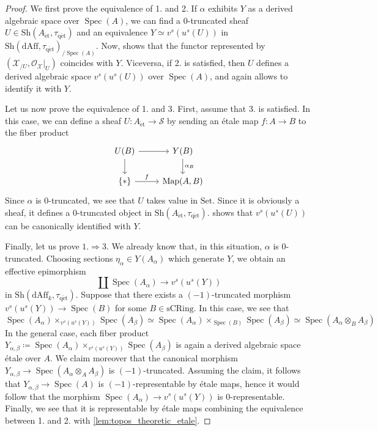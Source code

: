 \documentclass[12pt,a4paper,reqno]{amsart}
\theoremstyle{plain}
\theoremstyle{definition}
\theoremstyle{remark}
\numberwithin{equation}{section}
\begin{document}
\begin{proof}
	We first prove the equivalence of 1. and 2.
	If $\alpha$ exhibits $Y$ as a derived algebraic space over $\operatorname{Spec}(A)$, we can find a $0$-truncated sheaf $U \in {\mathrm{Sh}}(A_{\mathrm{\acute{e}t}}, {\tau_\mathrm{q\acute{e}t}})$ and an equivalence $Y \simeq v^s(u^s(U))$ in ${\mathrm{Sh}}(\mathrm{dAff}, {\tau_\mathrm{q\acute{e}t}})_{/\operatorname{Spec}(A)}$.
	Now, \cite[Remark 2.3.4]{DAG-V} shows that the functor represented by $({\mathcal X}_{/U}, {\mathcal O}_{\mathcal X} |_U)$ coincides with $Y$.
	Viceversa, if 2. is satisfied, then $U$ defines a derived algebraic space $v^s(u^s(U))$ over $\operatorname{Spec}(A)$, and \cite[Remark 2.3.4]{DAG-V} again allows to identify it with $Y$.
	
	Let us now prove the equivalence of 1. and 3. First, assume that 3. is satisfied.
	In this case, we can define a sheaf $U \colon A_{\mathrm{\acute{e}t}} \to {\mathcal S}$ by sending an \'etale map $f \colon A \to B$ to the fiber product
	\[ \begin{tikzcd}
	U(B) \arrow{r} \arrow{d} & Y(B) \arrow{d}{\alpha_B} \\
	\{*\} \arrow{r}{f} & \operatorname{Map}(A,B)
	\end{tikzcd} \]
	Since $\alpha$ is $0$-truncated, we see that $U$ takes value in ${\mathrm{Set}}$.
	Since it is obviously a sheaf, it defines a $0$-truncated object in ${\mathrm{Sh}}(A_{\mathrm{\acute{e}t}}, {\tau_\mathrm{q\acute{e}t}})$.
	\cite[Remark 2.3.4]{DAG-V} shows that $v^s(u^s(U))$ can be canonically identified with $Y$.
	
	Finally, let us prove $1. \Rightarrow 3.$
	We already know that, in this situation, $\alpha$ is $0$-truncated.
	Choosing sections $\eta_\alpha \in Y(A_\alpha)$ which generate $Y$, we obtain an effective epimorphism
	\[ \coprod \operatorname{Spec}(A_\alpha) \to v^s(u^s(Y)) \]
	in ${\mathrm{Sh}}(\mathrm{dAff}_k, {\tau_\mathrm{q\acute{e}t}})$.
	Suppose that there exists a $(-1)$-truncated morphism $v^s(u^s(Y)) \to \operatorname{Spec}(B)$ for some $B \in \mathrm{sCRing}$.
	In this case, we see that
	\[ \operatorname{Spec}(A_\alpha) \times_{v^s(u^s(Y))} \operatorname{Spec}(A_\beta) \simeq \operatorname{Spec}(A_\alpha) \times_{\operatorname{Spec}(B)} \operatorname{Spec}(A_\beta) \simeq \operatorname{Spec}(A_\alpha \otimes_B A_\beta) \]
	In the general case, each fiber product $Y_{\alpha, \beta} \coloneqq \operatorname{Spec}(A_\alpha) \times_{v^s(u^s(Y))} \operatorname{Spec}(A_\beta)$ is again a derived algebraic space \'etale over $A$. We claim moreover that the canonical morphism $Y_{\alpha, \beta} \to \operatorname{Spec}(A_\alpha \otimes_A A_\beta)$ is $(-1)$-truncated.
	Assuming the claim, it follows that $Y_{\alpha, \beta} \to \operatorname{Spec}(A)$ is $(-1)$-representable by \'etale maps, hence it would follow that the morphism $\operatorname{Spec}(A_\alpha) \to v^s(u^s(Y))$ is $0$-representable.
	Finally, we see that it is representable by \'etale maps combining the equivalence between 1. and 2. with \cref{lem:topos_theoretic_etale}.
	

\end{proof}
\end{document}
